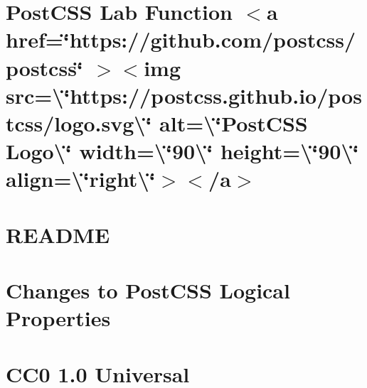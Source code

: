 \documentclass[twoside]{book}
\newcommand{\+}{\discretionary{\mbox{\scriptsize$\hookleftarrow$}}{}{}}
\begin{document}
\chapter{Post\+CSS Lab Function \texorpdfstring{$<$}{<}a href=\char`\"{}https\+://github.\+com/postcss/postcss\char`\"{} \texorpdfstring{$>$}{>}\texorpdfstring{$<$}{<}img src=\textbackslash{}\char`\"{}https\+://postcss.\+github.\+io/postcss/logo.\+svg\textbackslash{}\char`\"{} alt=\textbackslash{}\char`\"{}\+Post\+CSS Logo\textbackslash{}\char`\"{} width=\textbackslash{}\char`\"{}90\textbackslash{}\char`\"{} height=\textbackslash{}\char`\"{}90\textbackslash{}\char`\"{} align=\textbackslash{}\char`\"{}right\textbackslash{}\char`\"{}\texorpdfstring{$>$}{>}\texorpdfstring{$<$}{<}/a\texorpdfstring{$>$}{>}}
\label{md__c___users_vaishnavi_jadhav__desktop__developer_code_mean_stack_example_client_node_modules_pccde7a360b9d41c0b4cca2e494f50ef2}

\chapter{README}
\label{md__c___users_vaishnavi_jadhav__desktop__developer_code_mean_stack_example_client_node_modules_postcss_loader__r_e_a_d_m_e}

\chapter{Changes to Post\+CSS Logical Properties}
\label{md__c___users_vaishnavi_jadhav__desktop__developer_code_mean_stack_example_client_node_modules_p991033f1756fcc2d738a8fbfcbdaae3c}

\chapter{CC0 1.0 Universal}
\label{md__c___users_vaishnavi_jadhav__desktop__developer_code_mean_stack_example_client_node_modules_postcss_logical__l_i_c_e_n_s_e}

\end{document}
